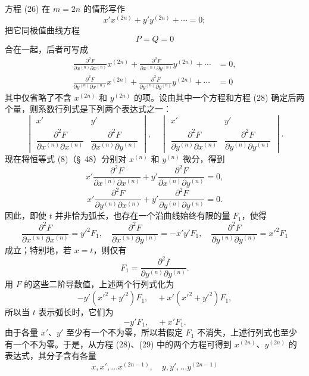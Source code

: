 \documentclass[11pt,a4paper,leqno]{article}
\begin{document}
方程 (26) 在 $m=2n$ 的情形写作
\begin{equation}\tag{28}
x'x^{(2n)}+y'y^{(2n)}+\cdots=0;
\end{equation}
把它同极值曲线方程
\[
P=Q=0
\]
合在一起，后者可写成
\begin{equation}\tag{29}
\begin{aligned}
\frac{\partial^2F}{\partial x^{(n)}\partial x^{(n)}}x^{(2n)}
+\frac{\partial^2F}{\partial x^{(n)}\partial y^{(n)}}y^{(2n)}+\cdots&=0,\\
\frac{\partial^2F}{\partial y^{(n)}\partial x^{(n)}}x^{(2n)}
+\frac{\partial^2F}{\partial y^{(n)}\partial y^{(n)}}y^{(2n)}+\cdots&=0
\end{aligned}
\end{equation}
其中仅省略了不含 $x^{(2n)}$ 和 $y^{(2n)}$ 的项。设由其中一个方程和方程 (28) 确定后两个量，则系数行列式是下列两个表达式之一：
\[
\begin{vmatrix}
x'&y'\\
\dfrac{\partial^2F}{\partial x^{(n)}\partial x^{(n)}}&\dfrac{\partial^2F}{\partial x^{(n)}\partial y^{(n)}}
\end{vmatrix},\quad
\begin{vmatrix}
x'&y'\\
\dfrac{\partial^2F}{\partial y^{(n)}\partial x^{(n)}}&\dfrac{\partial^2F}{\partial y^{(n)}\partial y^{(n)}}
\end{vmatrix}.
\]
现在将恒等式 (8)（\S~48）分别对 $x^{(n)}$ 和 $y^{(n)}$ 微分，得到
\[
x'\frac{\partial^2F}{\partial x^{(n)}\partial x^{(n)}}
+y'\frac{\partial^2F}{\partial x^{(n)}\partial y^{(n)}}=0,
\]
\[
x'\frac{\partial^2F}{\partial y^{(n)}\partial x^{(n)}}
+y'\frac{\partial^2F}{\partial y^{(n)}\partial y^{(n)}}=0.
\]
因此，即使 $t$ 并非恰为弧长，也存在一个沿曲线始终有限的量 $F_1$，使得
\[
\frac{\partial^2F}{\partial x^{(n)}\partial x^{(n)}}=y'^2F_1,
\quad
\frac{\partial^2F}{\partial x^{(n)}\partial y^{(n)}}=-x'y'F_1,
\quad
\frac{\partial^2F}{\partial y^{(n)}\partial y^{(n)}}=x'^2F_1
\]
成立；特别地，若 $x=t$，则仅有
\[
F_1=\frac{\partial^2f}{\partial y^{(n)}\partial y^{(n)}}.
\]
用 $F$ 的这些二阶导数值，上述两个行列式化为
\[
-y'(x'^2+y'^2)F_1,
\quad
+x'(x'^2+y'^2)F_1,
\]
所以当 $t$ 表示弧长时，它们为
\[
-y'F_1,
\quad
+x'F_1.
\]
由于各量 $x'$、$y'$ 至少有一个不为零，所以若假定 $F_1$ 不消失，上述行列式也至少有一个不为零。于是，从方程 (28)、(29) 中的两个方程可得到 $x^{(2n)}$、$y^{(2n)}$ 的表达式，其分子含有各量
\begin{equation}\tag{30}
x,x',\ldots x^{(2n-1)},\quad y,y',\ldots y^{(2n-1)}
\end{equation}
\end{document}
